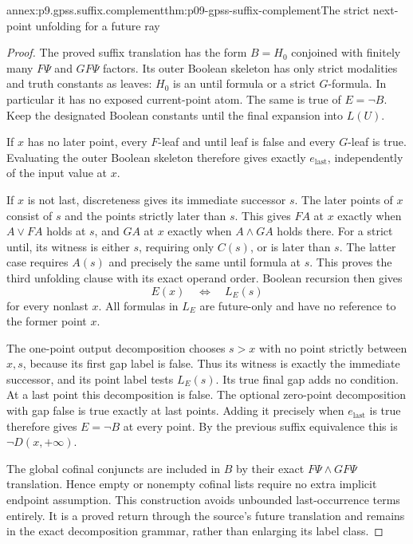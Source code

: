 \begin{annexitem}{annex:p9.gpss.suffix.complement}{thm:p09-gpss-suffix-complement}{The strict next-point unfolding for a future ray}
\begin{proof}
The proved suffix translation has
the form \(B=H_0\) conjoined
with finitely many \(F\Psi\)
and \(GF\Psi\) factors.
Its outer Boolean skeleton has
only strict modalities and
truth constants as leaves:
\(H_0\) is an until formula
or a strict \(G\)-formula.
In particular it has no exposed
current-point atom. The same
is true of \(E=\neg B\).
Keep the designated Boolean
constants until the final
expansion into \(L(U)\).

If \(x\) has no later point,
every \(F\)-leaf and until
leaf is false and every
\(G\)-leaf is true. Evaluating
the outer Boolean skeleton
therefore gives exactly
\(e_{\mathrm{last}}\), independently
of the input value at \(x\).

If \(x\) is not last,
discreteness gives its immediate
successor \(s\). The later
points of \(x\) consist of
\(s\) and the points strictly
later than \(s\). This gives
\(FA\) at \(x\) exactly
when \(A\lor FA\) holds
at \(s\), and \(GA\)
at \(x\) exactly when
\(A\land GA\) holds there.
For a strict until, its
witness is either \(s\),
requiring only \(C(s)\),
or is later than \(s\).
The latter case requires
\(A(s)\) and precisely the
same until formula at \(s\).
This proves the third unfolding
clause with its exact operand
order. Boolean recursion then
gives
\[
                         E(x)\quad\Longleftrightarrow\quad L_E(s)
\]
for every nonlast \(x\).
All formulas in \(L_E\) are
future-only and have no reference
to the former point \(x\).

The one-point output decomposition
chooses \(s>x\) with no point
strictly between \(x,s\),
because its first gap label is
false. Thus its witness is
exactly the immediate successor,
and its point label tests
\(L_E(s)\). Its true final
gap adds no condition. At a
last point this decomposition
is false. The optional zero-point
decomposition with gap false
is true exactly at last points.
Adding it precisely when
\(e_{\mathrm{last}}\) is true
therefore gives \(E=\neg B\)
at every point. By the previous
suffix equivalence this is
\(\neg D(x,+\infty)\).

The global cofinal conjuncts
are included in \(B\) by
their exact \(F\Psi\land GF\Psi\)
translation. Hence empty or
nonempty cofinal lists require
no extra implicit endpoint
assumption. This construction
avoids unbounded last-occurrence
terms entirely. It is a
proved return through the
source's future translation
and remains in the exact
decomposition grammar, rather
than enlarging its label class.
\end{proof}
\end{annexitem}

